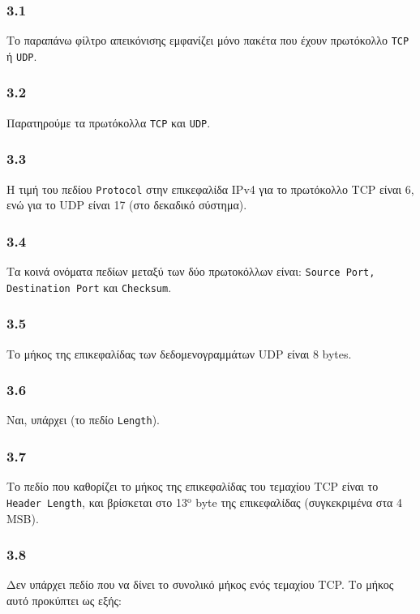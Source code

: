 		\subsubsection*{3.1}
			Το παραπάνω φίλτρο απεικόνισης εμφανίζει μόνο πακέτα που έχουν πρωτόκολλο \verb|TCP| ή \verb|UDP|.
		
		\subsubsection*{3.2} 
			Παρατηρούμε τα πρωτόκολλα \verb|TCP| και \verb|UDP|.
		
		\subsubsection*{3.3}
			Η τιμή του πεδίου \verb|Protocol| στην επικεφαλίδα IPv4 για το πρωτόκολλο TCP είναι 6, ενώ για το UDP είναι 17 (στο δεκαδικό σύστημα).
		
		\subsubsection*{3.4}
			Τα κοινά ονόματα πεδίων μεταξύ των δύο πρωτοκόλλων είναι: \verb|Source Port, Destination Port| και \verb|Checksum|.
					
		\subsubsection*{3.5}
			Το μήκος της επικεφαλίδας των δεδομενογραμμάτων UDP είναι 8 bytes.
		
		\subsubsection*{3.6}
			Ναι, υπάρχει (το πεδίο \verb|Length|).
		
		\subsubsection*{3.7}
			Το πεδίο που καθορίζει το μήκος της επικεφαλίδας του τεμαχίου TCP είναι το \verb|Header Length|, και βρίσκεται στο 13$^{\text{ο}}$ byte της επικεφαλίδας (συγκεκριμένα στα 4 MSB).
		
		\subsubsection*{3.8}
			Δεν υπάρχει πεδίο που να δίνει το συνολικό μήκος ενός τεμαχίου TCP. Το μήκος αυτό προκύπτει ως εξής: 
			

